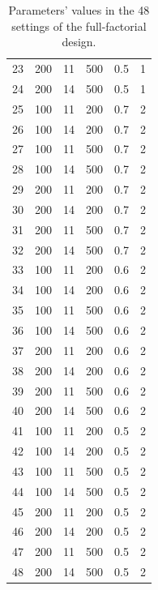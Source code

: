 \begin{table}[H]
{\begin{tabular}{lccccc}
23 &     200 &          11 &     500 &     0.5 &                1 \\
24 &     200 &          14 &     500 &     0.5 &                1 \\
25 &     100 &          11 &     200 &     0.7 &                2 \\
26 &     100 &          14 &     200 &     0.7 &                2 \\
27 &     100 &          11 &     500 &     0.7 &                2 \\
28 &     100 &          14 &     500 &     0.7 &                2 \\
29 &     200 &          11 &     200 &     0.7 &                2 \\
30 &     200 &          14 &     200 &     0.7 &                2 \\
31 &     200 &          11 &     500 &     0.7 &                2 \\
32 &     200 &          14 &     500 &     0.7 &                2 \\
33 &     100 &          11 &     200 &     0.6 &                2 \\
34 &     100 &          14 &     200 &     0.6 &                2 \\
35 &     100 &          11 &     500 &     0.6 &                2 \\
36 &     100 &          14 &     500 &     0.6 &                2 \\
37 &     200 &          11 &     200 &     0.6 &                2 \\
38 &     200 &          14 &     200 &     0.6 &                2 \\
39 &     200 &          11 &     500 &     0.6 &                2 \\
40 &     200 &          14 &     500 &     0.6 &                2 \\
41 &     100 &          11 &     200 &     0.5 &                2 \\
42 &     100 &          14 &     200 &     0.5 &                2 \\
43 &     100 &          11 &     500 &     0.5 &                2 \\
44 &     100 &          14 &     500 &     0.5 &                2 \\
45 &     200 &          11 &     200 &     0.5 &                2 \\
46 &     200 &          14 &     200 &     0.5 &                2 \\
47 &     200 &          11 &     500 &     0.5 &                2 \\
48 &     200 &          14 &     500 &     0.5 &                2 \\
\bottomrule
\end{tabular}}
    \caption{Parameters' values in the 48 settings of the full-factorial design.}
    \label{tab:values_settings}
\end{table}



